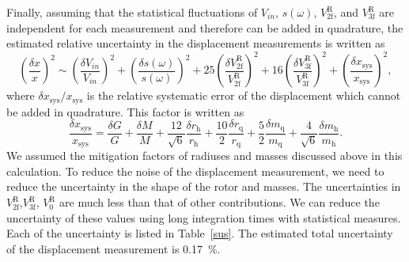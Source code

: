 \documentclass[%
 reprint,
superscriptaddress,
 amsmath,amssymb,
 aps,
]{revtex4-1}
\begin{document}
Finally, assuming that the statistical fluctuations of $V_{in}$, $s(\omega)$, $V^{\mathrm{R}}_{{\mathrm{2f}}}$, and $V^{\mathrm{R}}_{{\mathrm{3f}}}$ are independent for each measurement and therefore can be added in quadrature, the estimated relative uncertainty in the displacement measurements is written as
 \footnotesize
\begin{equation}
\left( \frac{\delta x}{x} \right)^2 \!\sim \! \left( \!\frac{\delta V_{in}}{V_{in}}\! \right)^2+\left(\! \frac{\delta s(\omega)}{s(\omega)} \! \right)^2\!+\!25\!\left(\!\frac{\delta V^{\mathrm{R}}_{{\mathrm{2f}}}}{V^{\mathrm{R}}_{{\mathrm{2f}}}}\! \right)^2+16\!\left(\! \frac{\delta V^{\mathrm{R}}_{{\mathrm{3f}}}}{V^{\mathrm{R}}_{{\mathrm{3f}}}}\! \right)^2\!+ \left(\! \frac{\delta x_{\mathrm{sys}}}{x_{\mathrm{sys}}} \! \right)^2 \label{deltax},
\end{equation}
\normalsize
where $\delta x_{\mathrm{sys}}/x_{\mathrm{sys}}$ is the relative systematic error of the displacement which cannot be added in quadrature. This factor is written as
 \footnotesize
\begin{equation}
\frac{\delta x_{\mathrm{sys}}}{x_{\mathrm{sys}}}=\frac{\delta G}{G} + \frac{\delta M}{M} +\frac{12}{\sqrt{6}} \frac{\delta r_{\mathrm{h}}}{r_{\mathrm{h}}} +\frac{10}{2} \frac{\delta r_{\mathrm{q}}}{r_{\mathrm{q}}}  +\frac{5}{2} \frac{\delta m_{\mathrm{q}}}{m_{\mathrm{q}}} +\!\frac{4}{\sqrt{6}}  \! \frac{\delta m_{\mathrm{h}}}{m_{\mathrm{h}}}.
\end{equation}
\normalsize
We assumed the mitigation factors of radiuses and masses discussed above in this calculation.
To reduce the noise of the displacement measurement, we need to reduce the uncertainty in the shape of the rotor and masses.
The uncertainties in $V^{\mathrm{R}}_{\mathrm{2f}}$,$V^{\mathrm{R}}_{\mathrm{3f}}$, $V^{\mathrm{R}}_{0}$ are much less than that of other contributions. We can reduce the uncertainty of these values using long integration times with statistical measures. Each of the uncertainty is listed in Table~\ref{sus}. The estimated  total uncertainty of the displacement measurement is 0.17~\%.
\end{document}
